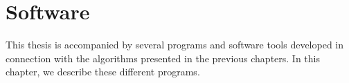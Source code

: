 \chapter{Software}\label{chap:logiciel}

This thesis is accompanied by several programs and software tools developed in connection with the algorithms presented in the previous chapters.
In this chapter, we describe these different programs.





